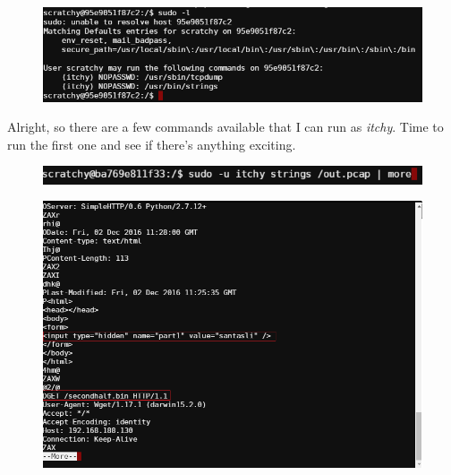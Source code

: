 \documentclass[writeup.tex]{subfiles}
\begin{document}
			\begin{figure}[H]
				\centering
				\includegraphics[width=\linewidth]{"screenshots/terminals/Terminal 1 - sudo -l"}
			\end{figure}
			
			Alright, so there are a few commands available that I can run as \textit{itchy}. Time to run the first one and see if there's anything exciting.
			
			\begin{figure}[H]
				\centering
				\includegraphics[scale=1]{"screenshots/terminals/Terminal 1 - strings pcap"}
			\end{figure}
			\begin{figure}[H]
				\centering
				\includegraphics[width=\linewidth]{"screenshots/terminals/Terminal 1 - strings pcap pt3"}
			\end{figure}
			
\end{document}
